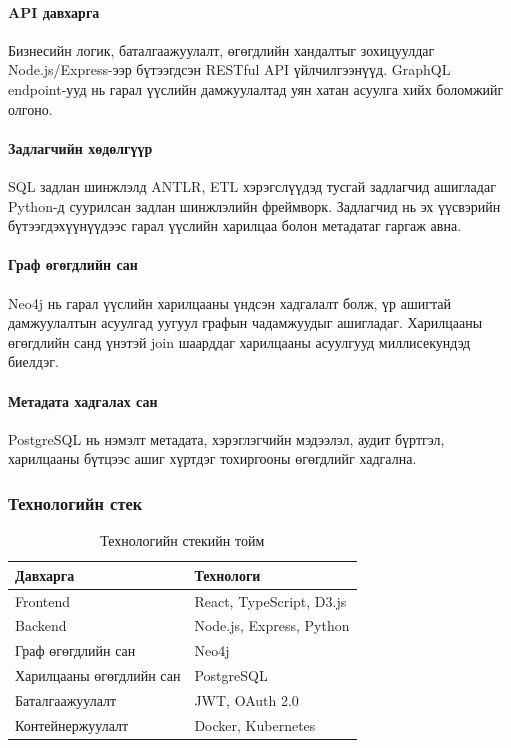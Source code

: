 \paragraph{API давхарга}
Бизнесийн логик, баталгаажуулалт, өгөгдлийн хандалтыг зохицуулдаг Node.js/Express-ээр бүтээгдсэн RESTful API үйлчилгээнүүд. GraphQL endpoint-ууд нь гарал үүслийн дамжуулалтад уян хатан асуулга хийх боломжийг олгоно.

\paragraph{Задлагчийн хөдөлгүүр}
SQL задлан шинжлэлд ANTLR, ETL хэрэгслүүдэд тусгай задлагчид ашигладаг Python-д суурилсан задлан шинжлэлийн фреймворк. Задлагчид нь эх үүсвэрийн бүтээгдэхүүнүүдээс гарал үүслийн харилцаа болон метадатаг гаргаж авна.

\paragraph{Граф өгөгдлийн сан}
Neo4j нь гарал үүслийн харилцааны үндсэн хадгалалт болж, үр ашигтай дамжуулалтын асуулгад уугуул графын чадамжуудыг ашигладаг. Харилцааны өгөгдлийн санд үнэтэй join шаарддаг харилцааны асуулгууд миллисекундэд биелдэг.

\paragraph{Метадата хадгалах сан}
PostgreSQL нь нэмэлт метадата, хэрэглэгчийн мэдээлэл, аудит бүртгэл, харилцааны бүтцээс ашиг хүртдэг тохиргооны өгөгдлийг хадгална.

\subsubsection{Технологийн стек}

\begin{table}[htbp]
\centering
\caption{Технологийн стекийн тойм}
\label{tab:tech_stack}
\begin{tabular}{|l|l|}
\hline
\textbf{Давхарга} & \textbf{Технологи} \\
\hline
Frontend & React, TypeScript, D3.js \\
\hline
Backend & Node.js, Express, Python \\
\hline
Граф өгөгдлийн сан & Neo4j \\
\hline
Харилцааны өгөгдлийн сан & PostgreSQL \\
\hline
Баталгаажуулалт & JWT, OAuth 2.0 \\
\hline
Контейнержуулалт & Docker, Kubernetes \\
\hline
\end{tabular}
\end{table}

